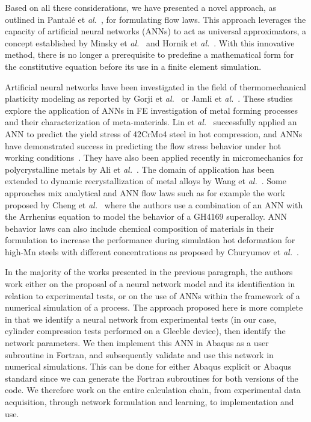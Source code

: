 \documentclass[algorithms,article,submit,pdftex,oneauthors]{Definitions/mdpi}
\makeatletter
\DeclareRobustCommand{\eal}{et \emph{al.}\@\xspace}
\makeatother
\begin{document}
Based on all these considerations, we have presented a novel approach, as outlined in Pantalé \eal~\cite{Pantale-2021-EIN, Pantale-2023-DIA}, for formulating flow laws.
This approach leverages the capacity of artificial neural networks (ANNs) to act as universal approximators, a concept established by Minsky \eal~\cite{Minsky-1969-PIC} and Hornik \eal~\cite{Hornik-1989-MFN}.
With this innovative method, there is no longer a prerequisite to predefine a mathematical form for the constitutive equation before its use in a finite element simulation.

Artificial neural networks have been investigated in the field of thermomechanical plasticity modeling as reported by Gorji \eal~\cite{Gorji-2020} or Jamli \eal~\cite{Jamli-2019-SNN}.
These studies explore the application of ANNs in FE investigation of metal forming processes and their characterization of meta-materials.
Lin \eal~\cite{Lin-2008} successfully applied an ANN to predict the yield stress of 42CrMo4 steel in hot compression, and ANNs have demonstrated success in predicting the flow stress behavior under hot working conditions~\cite{Stoffel-2018-ANN, Stoffel-2019-NNB}.
They have also been applied recently in micromechanics for polycrystalline metals by Ali \eal~\cite{Ali-2019-AAN}.
The domain of application has been extended to dynamic recrystallization of metal alloys by Wang \eal~\cite{Wang-2021-ANN}.
Some approaches mix analytical and ANN flow laws such as for example the work proposed by Cheng \eal~\cite{Cheng-2022-CWD} where the authors use a combination of an ANN with the Arrhenius equation to model the behavior of a GH4169 superalloy.
ANN behavior laws can also include chemical composition of materials in their formulation to increase the performance during simulation hot deformation for high-Mn steels with different concentrations as proposed by Churyumov \eal~\cite{Churyumov-2023-PTS}.

In the majority of the works presented in the previous paragraph, the authors work either on the proposal of a neural network model and its identification in relation to experimental tests, or on the use of ANNs within the framework of a numerical simulation of a process.
The approach proposed here is more complete in that we identify a neural network from experimental tests (in our case, cylinder compression tests performed on a Gleeble device), then identify the network parameters.
We then implement this ANN in Abaqus as a user subroutine in Fortran, and subsequently validate and use this network in numerical simulations.
This can be done for either Abaqus explicit or Abaqus standard since we can generate the Fortran subroutines for both versions of the code.
We therefore work on the entire calculation chain, from experimental data acquisition, through network formulation and learning, to implementation and use.
\end{document}
